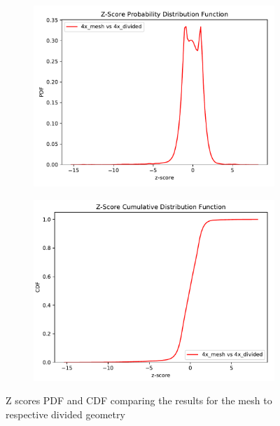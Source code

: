 \begin{figure}
	\begin{subfigure}[t]{0.5\textwidth}
		\includegraphics[width=\linewidth, trim={0cm 0cm 0cm 0.9cm},clip]{../figs/toy_p1/PDF_zscore_VPI_4xm_4xs.pdf}
		\label{fig:1dose_4x_split}
	\end{subfigure}\hfill
	\begin{subfigure}[t]{0.5\textwidth}
		\includegraphics[width=\linewidth, trim={0cm 0cm 0cm 0.8cm},clip]{../figs/toy_p1/CDF_zscore_VPI_4xm_4xs.pdf}
		\label{fig:1dose_4x_mesh}
	\end{subfigure}
	\caption{Z scores PDF and CDF comparing the results for the mesh to respective divided geometry }
	\label{fig:1dose}
\end{figure}

